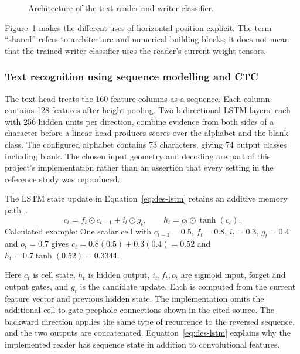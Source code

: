 \begin{figure}[!htbp]\centering
{}
\caption{Architecture of the text reader and writer classifier.~\cite{brauneevidence2026,braunepipeline2026}}
\label{fig:des-network}
\end{figure}

Figure~\ref{fig:des-network} makes the different uses of horizontal position explicit. The term ``shared'' refers to architecture and numerical building blocks; it does not mean that the trained writer classifier uses the reader's current weight tensors.~\cite[recognise.py; train.py]{braunepipeline2026}


\subsubsection{Text recognition using sequence modelling and CTC}
The text head treats the 160 feature columns as a sequence. Each column contains 128 features after height pooling. Two bidirectional LSTM layers, each with 256 hidden units per direction, combine evidence from both sides of a character before a linear head produces scores over the alphabet and the blank class. The configured alphabet contains 73 characters, giving 74 output classes including blank. The chosen input geometry and decoding are part of this project's implementation rather than an assertion that every setting in the reference study was reproduced.~\cite[recognise.py; train.py; trainlibrary.py]{braunepipeline2026}


The LSTM state update in Equation~\ref{eq:des-lstm} retains an additive memory path~\cite[p.~5, Eqs.~(9)--(11)]{graves2013}.
\begin{equation}
c_t=f_t\odot c_{t-1}+i_t\odot g_t,\qquad
h_t=o_t\odot\tanh(c_t).
\label{eq:des-lstm}
\end{equation}
Calculated example: One scalar cell with $c_{t-1}=0.5$, $f_t=0.8$, $i_t=0.3$, $g_t=0.4$ and $o_t=0.7$ gives $c_t=0.8(0.5)+0.3(0.4)=0.52$ and $h_t=0.7\tanh(0.52)=0.3344$. \cite[recognise.py, LstmForward]{braunepipeline2026}

Here $c_t$ is cell state, $h_t$ is hidden output, $i_t,f_t,o_t$ are sigmoid input, forget and output gates, and $g_t$ is the candidate update. Each is computed from the current feature vector and previous hidden state. The implementation omits the additional cell-to-gate peephole connections shown in the cited source. The backward direction applies the same type of recurrence to the reversed sequence, and the two outputs are concatenated. Equation~\ref{eq:des-lstm} explains why the implemented reader has sequence state in addition to convolutional features.~\cite[recognise.py; train.py; trainlibrary.py]{braunepipeline2026}

